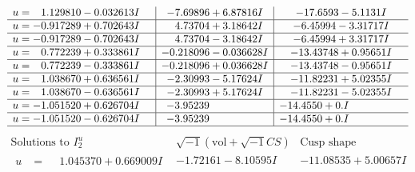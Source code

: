 \documentclass[1p]{elsarticle_modified}
\theoremstyle{definition}
\newcommand{\I}{\sqrt{-1}}
\begin{document}
$$\begin{array}{c|c|c}
\begin{aligned}
u &= \phantom{-}1.129810 - 0.032613 I\end{aligned}
 & -7.69896 + 6.87816 I & -17.6593 - 5.1131 I \\ \hline\begin{aligned}
u &= -0.917289 + 0.702643 I\end{aligned}
 & \phantom{-}4.73704 + 3.18642 I & -6.45994 - 3.31717 I \\ \hline\begin{aligned}
u &= -0.917289 - 0.702643 I\end{aligned}
 & \phantom{-}4.73704 - 3.18642 I & -6.45994 + 3.31717 I \\ \hline\begin{aligned}
u &= \phantom{-}0.772239 + 0.333861 I\end{aligned}
 & -0.218096 - 0.036628 I & -13.43748 + 0.95651 I \\ \hline\begin{aligned}
u &= \phantom{-}0.772239 - 0.333861 I\end{aligned}
 & -0.218096 + 0.036628 I & -13.43748 - 0.95651 I \\ \hline\begin{aligned}
u &= \phantom{-}1.038670 + 0.636561 I\end{aligned}
 & -2.30993 - 5.17624 I & -11.82231 + 5.02355 I \\ \hline\begin{aligned}
u &= \phantom{-}1.038670 - 0.636561 I\end{aligned}
 & -2.30993 + 5.17624 I & -11.82231 - 5.02355 I \\ \hline\begin{aligned}
u &= -1.051520 + 0.626704 I\end{aligned}
 & -3.95239\phantom{ +0.000000I} & -14.4550 + 0. I\phantom{ +0.000000I} \\ \hline\begin{aligned}
u &= -1.051520 - 0.626704 I\end{aligned}
 & -3.95239\phantom{ +0.000000I} & -14.4550 + 0. I\phantom{ +0.000000I}\\
 \hline 
 \end{array}$$\newpage$$\begin{array}{c|c|c}  
\text{Solutions to }I^u_{2}& \I (\text{vol} + \sqrt{-1}CS) & \text{Cusp shape}\\
 \hline 
\begin{aligned}
u &= \phantom{-}1.045370 + 0.669009 I\end{aligned}
 & -1.72161 - 8.10595 I & -11.08535 + 5.00657 I \\ \hline\begin{aligned}

\end{aligned}
\end{array}$$
\end{document}
